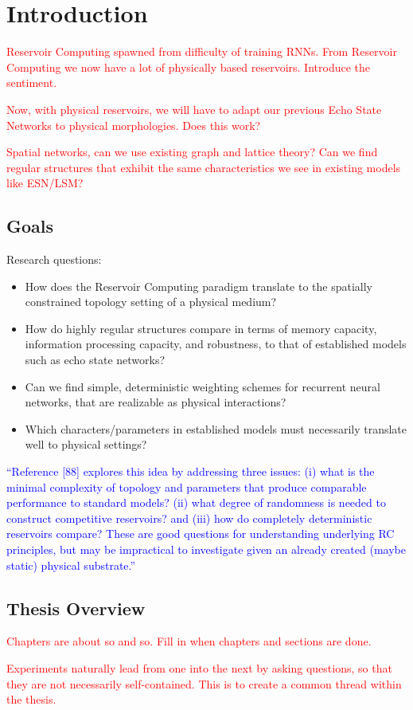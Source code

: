 \chapter{Introduction}

\textcolor{red}{
  Reservoir Computing spawned from difficulty of training RNNs. From Reservoir
Computing we now have a lot of physically based reservoirs. Introduce the
sentiment.
}

\textcolor{red}{
  Now, with physical reservoirs, we will have to adapt our previous Echo State
Networks to physical morphologies. Does this work?
}

\textcolor{red}{
  Spatial networks, can we use existing graph and lattice theory? Can we find
regular structures that exhibit the same characteristics we see in existing
models like ESN/LSM?
}

\section{Goals}

Research questions:

\begin{itemize}
\item How does the Reservoir Computing paradigm translate to the spatially
constrained topology setting of a physical medium?
\item How do highly regular structures compare in terms of memory capacity,
information processing capacity, and robustness, to that of established models
such as echo state networks?
\item Can we find simple, deterministic weighting schemes for recurrent neural
networks, that are realizable as physical interactions?
\item Which characters/parameters in established models must necessarily
translate well to physical settings?
\end{itemize}

\textcolor{blue}{
  ``Reference [88] explores this idea by addressing three issues: (i) what is
the minimal complexity of topology and parameters that produce comparable
performance to standard models?  (ii) what degree of randomness is needed to
construct competitive reservoirs? and (iii) how do completely deterministic
reservoirs compare? These are good questions for understanding underlying RC
principles, but may be impractical to investigate given an already created
(maybe static) physical substrate.''
}

\section{Thesis Overview}

\textcolor{red}{
  Chapters are about so and so. Fill in when chapters and sections are done.
}

\textcolor{red}{
  Experiments naturally lead from one into the next by asking questions, so that
they are not necessarily self-contained. This is to create a common thread
within the thesis.
}

